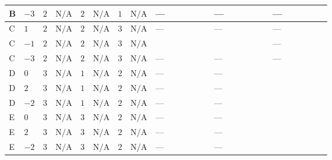 \documentclass[8pt]{article}
\begin{document}
\begin{landscape}
\begin{longtable}{@{}llcccccc >{\raggedright\arraybackslash}p{0.21\linewidth} >{\raggedright\arraybackslash}p{0.21\linewidth} >{\raggedright\arraybackslash}p{0.21\linewidth}@{}}
\midrule
B & $-3$ & $2$ & $\text{N/A}$ & $2$ & $\text{N/A}$ & $1$ & $\text{N/A}$ & --- & --- & --- \\
\midrule
C & $1$ & $2$ & $\text{N/A}$ & $2$ & $\text{N/A}$ & $3$ & $\text{N/A}$ & --- & --- & --- \\
\midrule
C & $-1$ & $2$ & $\text{N/A}$ & $2$ & $\text{N/A}$ & $3$ & $\text{N/A}$ & \scriptsize\adjustbox{max width=\linewidth}{$\begin{gathered} 6 {\mu_{\mathrm{T3GeneralS1S2}}} \left({\lambda_{11}}\right)^{*}\end{gathered}$} & \scriptsize\adjustbox{max width=\linewidth}{$\begin{gathered} +6 {\lambda_{11}} \left({\mu_{\mathrm{T3GeneralS1S2}}}\right)^{*}\end{gathered}$} & --- \\
\midrule
C & $-3$ & $2$ & $\text{N/A}$ & $2$ & $\text{N/A}$ & $3$ & $\text{N/A}$ & --- & --- & --- \\
\midrule
D & $0$ & $3$ & $\text{N/A}$ & $1$ & $\text{N/A}$ & $2$ & $\text{N/A}$ & --- & --- & \scriptsize\adjustbox{max width=\linewidth}{$\begin{gathered} -12 {g_2}^2 {m_1^2}\end{gathered}$} \\
\midrule
D & $2$ & $3$ & $\text{N/A}$ & $1$ & $\text{N/A}$ & $2$ & $\text{N/A}$ & --- & --- & \scriptsize\adjustbox{max width=\linewidth}{$\begin{gathered} -12 {g_2}^2 {m_1^2}\end{gathered}$} \\
\midrule
D & $-2$ & $3$ & $\text{N/A}$ & $1$ & $\text{N/A}$ & $2$ & $\text{N/A}$ & --- & --- & \scriptsize\adjustbox{max width=\linewidth}{$\begin{gathered} -12 {g_2}^2 {m_1^2}\end{gathered}$} \\
\midrule
E & $0$ & $3$ & $\text{N/A}$ & $3$ & $\text{N/A}$ & $2$ & $\text{N/A}$ & --- & --- & \scriptsize\adjustbox{max width=\linewidth}{$\begin{gathered} -12 {g_2}^2 {m_1^2}\end{gathered}$} \\
\midrule
E & $2$ & $3$ & $\text{N/A}$ & $3$ & $\text{N/A}$ & $2$ & $\text{N/A}$ & --- & --- & \scriptsize\adjustbox{max width=\linewidth}{$\begin{gathered} -12 {g_2}^2 {m_1^2}\end{gathered}$} \\
\midrule
E & $-2$ & $3$ & $\text{N/A}$ & $3$ & $\text{N/A}$ & $2$ & $\text{N/A}$ & --- & --- & \scriptsize\adjustbox{max width=\linewidth}{$\begin{gathered} -12 {g_2}^2 {m_1^2}\end{gathered}$} \\

\end{longtable}
\end{landscape}
\end{document}
